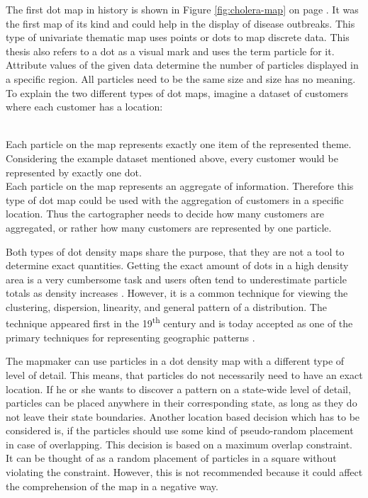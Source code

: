 The first dot map in history is shown in Figure \ref{fig:cholera-map} on page \pageref{fig:cholera-map}. It was the first map of its kind and could help in the display of disease outbreaks. This type of univariate thematic map uses points or dots to map discrete data. This thesis also refers to a dot as a visual mark and uses the term particle for it. Attribute values of the given data determine the number of particles displayed in a specific region. All particles need to be the same size and size has no meaning. To explain the two different types of dot maps, imagine a dataset of customers where each customer has a location:

\begin{enumerate}
 \hfill \\
Each particle on the map represents exactly one item of the represented theme. Considering the example dataset mentioned above, every customer would be represented by exactly one dot.
\newpage
{} \hfill \\
Each particle on the map represents an aggregate of information. Therefore this type of dot map could be used with the aggregation of customers in a specific location. Thus the cartographer needs to decide how many customers are aggregated, or rather how many customers are represented by one particle.
\end{enumerate}

Both types of dot density maps share the purpose, that they are not a tool to determine exact quantities. Getting the exact amount of dots in a high density area is a very cumbersome task and users often tend to underestimate particle totals as density increases . However, it is a common technique for viewing the clustering, dispersion, linearity, and general pattern of a distribution. The technique appeared first in the 19\textsuperscript{th} century and is today accepted as one of the primary techniques for representing geographic patterns .

The mapmaker can use particles in a dot density map with a different type of level of detail. This means, that particles do not necessarily need to have an exact location. If he or she wants to discover a pattern on a state-wide level of detail, particles can be placed anywhere in their corresponding state, as long as they do not leave their state boundaries.
Another location based decision which has to be considered is, if the particles should use some kind of pseudo-random placement in case of overlapping. This decision is based on a maximum overlap constraint. It can be thought of as a random placement of particles in a square without violating the constraint. However, this is not recommended because it could affect the comprehension of the map in a negative way.

